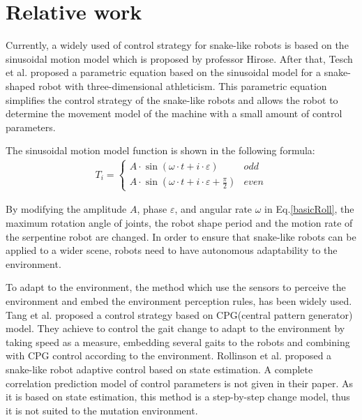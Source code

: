 \section{Relative work}
Currently, a widely used of control strategy for snake-like robots is based on the sinusoidal motion model\cite{HiroseSine} which is proposed by professor Hirose. After that, Tesch et al. proposed a parametric equation based on the sinusoidal model for a snake-shaped robot with three-dimensional athleticism\cite{ChosetSine}. This parametric equation simplifies the control strategy of the snake-like robots and allows the robot to determine the movement model of the machine with a small amount of control parameters.

The sinusoidal motion model function is shown in the following formula:
\begin{eqnarray}\label{basicRoll}
T_i=\left\{
\begin{array}{lr}
A\cdot \sin (\omega \cdot t + i\cdot \varepsilon )&odd\\
A\cdot \sin (\omega \cdot t + i\cdot \varepsilon +  \frac{\pi}{2})&even
\end{array}
\right.
\end{eqnarray}

By modifying the amplitude $A$, phase $\varepsilon$, and angular rate $\omega$ in Eq.\ref{basicRoll}, the maximum rotation angle of joints, the robot shape period and the motion rate of the serpentine robot are changed. In order to ensure that snake-like robots can be applied to a wider scene, robots need to have autonomous adaptability to the environment.

To adapt to the environment, the method which use the sensors to perceive the environment and embed the environment perception rules, has been widely used\cite{CPGenabling}\cite{GaitBasedCompliant}\cite{BalancingAndControl}\cite{FeedbackControlOfSoft}. Tang et al. proposed a control strategy based on CPG(central pattern generator) model\cite{CPGenabling}. They achieve to control the gait change to adapt to the environment by taking speed as a measure,  embedding several gaits to the robots and combining with CPG control according to the environment. Rollinson et al. proposed a snake-like robot adaptive control based on state estimation\cite{GaitBasedCompliant}. A complete correlation prediction model of control parameters is not given in their paper. As it is based on state estimation, this method is a step-by-step change model, thus it is not suited to the mutation environment. %


